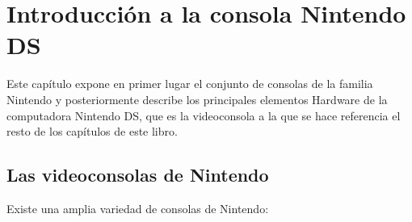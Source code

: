 \chapter{Introducción a la consola Nintendo DS}

Este capítulo expone en primer lugar el conjunto de consolas de la familia Nintendo y posteriormente describe los principales elementos Hardware de la computadora Nintendo DS, que es la videoconsola a la que se hace referencia el resto de los capítulos de este libro.

\section{Las videoconsolas de Nintendo}

Existe una amplia variedad de consolas de Nintendo:\cite{Barrachina17}

